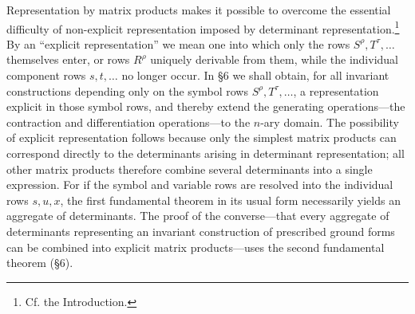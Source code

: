 \documentclass[10pt]{article}
\begin{document}
Representation by matrix products makes it possible to overcome the essential difficulty of non-explicit representation imposed by determinant representation.\footnote{Cf. the Introduction.} By an ``explicit representation'' we mean one into which only the rows $S^\rho,T^\tau,\ldots$ themselves enter, or rows $R^\rho$ uniquely derivable from them, while the individual component rows $s,t,\ldots$ no longer occur. In \S6 we shall obtain, for all invariant constructions depending only on the symbol rows $S^\rho,T^\tau,\ldots$, a representation explicit in those symbol rows, and thereby extend the generating operations---the contraction and differentiation operations---to the $n$-ary domain. The possibility of explicit representation follows because only the simplest matrix products can correspond directly to the determinants arising in determinant representation; all other matrix products therefore combine several determinants into a single expression. For if the symbol and variable rows are resolved into the individual rows $s,u,x$, the first fundamental theorem in its usual form necessarily yields an aggregate of determinants. The proof of the converse---that every aggregate of determinants representing an invariant construction of prescribed ground forms can be combined into explicit matrix products---uses the second fundamental theorem (\S6).
\end{document}
